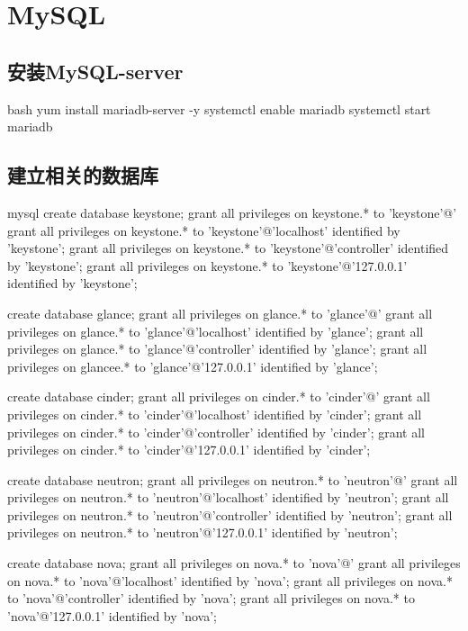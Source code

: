 \section{MySQL}
\subsection{安装MySQL-server}

\begin{code-block}{bash}
yum install mariadb-server -y
systemctl enable mariadb
systemctl start mariadb
\end{code-block}

\subsection{建立相关的数据库}
\begin{code-block}{mysql}
create database keystone;
grant all privileges on keystone.* to 'keystone'@'%
grant all privileges on keystone.* to 'keystone'@'localhost' identified by 'keystone';
grant all privileges on keystone.* to 'keystone'@'controller' identified by 'keystone';
grant all privileges on keystone.* to 'keystone'@'127.0.0.1' identified by 'keystone';

create database glance;
grant all privileges on glance.* to 'glance'@'%
grant all privileges on glance.* to 'glance'@'localhost' identified by 'glance';
grant all privileges on glance.* to 'glance'@'controller' identified by 'glance';
grant all privileges on glancee.* to 'glance'@'127.0.0.1' identified by 'glance';

create database cinder;
grant all privileges on cinder.* to 'cinder'@'%
grant all privileges on cinder.* to 'cinder'@'localhost' identified by 'cinder';
grant all privileges on cinder.* to 'cinder'@'controller' identified by 'cinder';
grant all privileges on cinder.* to 'cinder'@'127.0.0.1' identified by 'cinder';

create database neutron;
grant all privileges on neutron.* to 'neutron'@'%
grant all privileges on neutron.* to 'neutron'@'localhost' identified by 'neutron';
grant all privileges on neutron.* to 'neutron'@'controller' identified by 'neutron';
grant all privileges on neutron.* to 'neutron'@'127.0.0.1' identified by 'neutron';

create database nova;
grant all privileges on nova.* to 'nova'@'%
grant all privileges on nova.* to 'nova'@'localhost' identified by 'nova';
grant all privileges on nova.* to 'nova'@'controller' identified by 'nova';
grant all privileges on nova.* to 'nova'@'127.0.0.1' identified by 'nova';
\end{code-block}